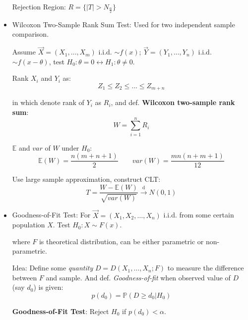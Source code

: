 \begin{itemize}
        Rejection Region: $R=\{|T|>N_\frac{\alpha}{2}\}$

        \item Wilcoxon Two-Sample Rank Sum Test: Used for two independent sample comparison.
        
        Assume $\vec{X}=(X_1,\ldots,X_m)$ i.i.d. $\sim f(x)$; $\vec{Y}=(Y_1,\ldots,Y_n)$ i.i.d. $\sim f(x-\theta)$, test $H_0:\theta=0\longleftrightarrow H_1:\theta\neq 0$.

        Rank $X_i$ and $Y_i$ as:
        \begin{equation}
            Z_1\leq Z_2\leq\ldots\leq Z_{m+n}
        \end{equation}

        in which denote rank of $Y_i$ as $R_i$, and def. \textbf{Wilcoxon two-sample rank sum}:
        \begin{equation}W=\sum_{i=1}^n R_i\end{equation}

        $\mathbb{E}$ and $var$ of $W$ under $H_0$:
\begin{equation}\mathbb{E}(W)=\frac{n(m+n+1)}{2}\qquad var(W)=\frac{mn(n+m+1)}{12}\end{equation}

        Use large sample approximation, construct CLT:
        \begin{equation}
            T=\frac{W-\mathbb{E}(W)}{\sqrt{var(W)}}\xrightarrow[]{\mathrm{d}}N(0,1)
        \end{equation}







        \item Goodness-of-Fit Test: For $\vec{X}=(X_1,X_2,\ldots,X_n)$ i.i.d. from some certain population $X$. Test $H_0:X\sim F(x)$.
        
        where $F$ is theoretical distribution, can be either parametric or non-parametric.

        Idea: Define some \textit{quantity} $D=D(X_1,\ldots,X_n;F)$ to measure the difference between $F$ and sample. And def. \textit{Goodness-of-fit} when observed value of $D$ (say $d_0$) is given:
        \begin{equation}p(d_0)=\mathbb{P}(D\geq d_0|H_0)\end{equation}

        \textbf{Goodness-of-Fit Test}: Reject $H_0$ if $p(d_0)<\alpha$.



\end{itemize}
